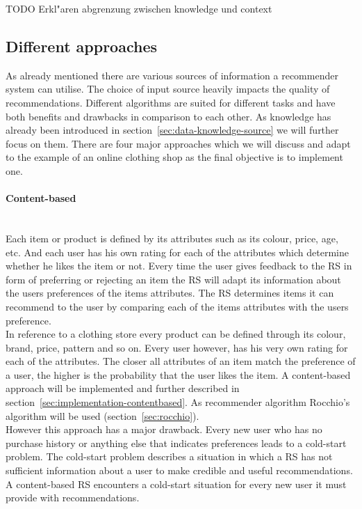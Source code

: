{\color{red}TODO Erkl"aren abgrenzung zwischen knowledge und context}


\subsection{Different approaches}
\label{sec:recommenderapproaches}
As already mentioned there are various sources of information a recommender system can utilise.
The choice of input source heavily impacts the quality of recommendations.
Different algorithms are suited for different tasks and have both benefits and drawbacks in comparison to each other.\citep[p.~377-378]{burke:2007}
As knowledge has already been introduced in section~\ref{sec:data-knowledge-source} we will further focus on them.
There are four major approaches \citep[p.~378]{burke:2007} which we will discuss and adapt to the example of an online clothing shop as the final objective is to implement one.

\paragraph{Content-based}\hfill\\
Each item or product is defined by its attributes such as its colour, price, age, etc.
And each user has his own rating for each of the attributes which determine whether he likes the item or not.
Every time the user gives feedback to the RS in form of preferring or rejecting an item the RS will adapt its information about the users preferences of the items attributes.
The RS determines items it can recommend to the user by comparing each of the items attributes with the users preference.
\citep[p.~75]{lops:2011}\\
In reference to a clothing store every product can be defined through its colour, brand, price, pattern and so on.
Every user however, has his very own rating for each of the attributes.
The closer all attributes of an item match the preference of a user, the higher is the probability that the user likes the item.
A content-based approach will be implemented and further described in section~\ref{sec:implementation-contentbased}.
As recommender algorithm Rocchio's algorithm will be used (section~\ref{sec:rocchio}).
\\
However this approach has a major drawback.
Every new user who has no purchase history or anything else that indicates preferences leads to a  cold-start problem.
The cold-start problem describes a situation in which a RS has not sufficient information about a user to make credible and useful recommendations.
A content-based RS encounters a cold-start situation for every new user it must provide with recommendations.
\citep[p.~378-379]{burke:2007}

